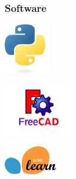 \documentclass{beamer}
\begin{document}
\begin{frame}
\frametitle{Software}

\centering

\begin{minipage}{0.3\textwidth}
    \centering
    \includegraphics[width=2.0cm]{figs/python.jpeg}
\end{minipage}
\hfill
\begin{minipage}{0.3\textwidth}
    \centering
    \includegraphics[width=3.0cm]{figs/freecad.png}
\end{minipage}
\hfill
\begin{minipage}{0.3\textwidth}
    \centering
    \includegraphics[width=2.3cm]{figs/sklearn.png}
\end{minipage}

\vspace{0.3cm} %



\end{frame}
\end{document}
